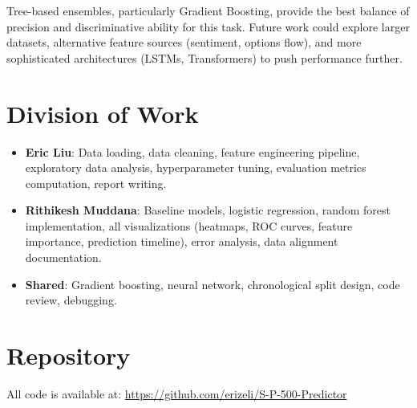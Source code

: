 \documentclass[11pt]{article}
\begin{document}
Tree-based ensembles, particularly Gradient Boosting, provide the best balance of precision and discriminative ability for this task. Future work could explore larger datasets, alternative feature sources (sentiment, options flow), and more sophisticated architectures (LSTMs, Transformers) to push performance further.

\section*{Division of Work}

\begin{itemize}
    \item \textbf{Eric Liu}: Data loading, data cleaning, feature engineering pipeline, exploratory data analysis, hyperparameter tuning, evaluation metrics computation, report writing.
    \item \textbf{Rithikesh Muddana}: Baseline models, logistic regression, random forest implementation, all visualizations (heatmaps, ROC curves, feature importance, prediction timeline), error analysis, data alignment documentation.
    \item \textbf{Shared}: Gradient boosting, neural network, chronological split design, code review, debugging.
\end{itemize}

\section*{Repository}

All code is available at: \url{https://github.com/erizeli/S-P-500-Predictor}
\end{document}
